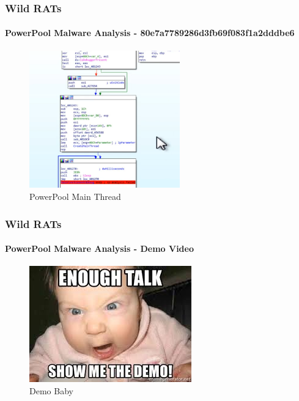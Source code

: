\documentclass[aspectratio=169]{beamer}
\begin{document}
\begin{frame}
  \frametitle{Wild RATs}
  \framesubtitle{PowerPool Malware Analysis - 80e7a7789286d3fb69f083f1a2dddbe6}
  \begin{center}
    \begin{figure}
      \includegraphics[width=6.5cm,keepaspectratio]{powerpool_main_thread}
      \caption{PowerPool Main Thread}
    \end{figure}
  \end{center}
\end{frame}

\begin{frame}
  \frametitle{Wild RATs}
  \framesubtitle{PowerPool Malware Analysis - Demo Video}
  \begin{center}
    \begin{figure}
      \includegraphics[width=7cm,keepaspectratio]{demo_baby}
      \caption{Demo Baby}
    \end{figure}
  \end{center}
\end{frame}
\end{document}
